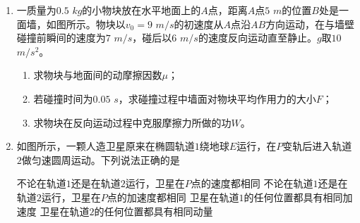 \begin{enumerate}[leftmargin=0em]
{}


\newpage
\item 
{}
一质量为$ 0.5 $ $ kg $的小物块放在水平地面上的$ A $点，距离$ A $点$ 5 $ $ m $的位置$ B $处是一面墙，如图所示。物块以$ v_{0} =9 $ $ m/s $的初速度从$ A $点沿$ AB $方向运动，在与墙壁碰撞前瞬间的速度为$ 7 $ $ m/s $，碰后以$ 6 $ $ m/s $的速度反向运动直至静止。$ g $取$ 10 $ $ m/s^{2} $。
\begin{enumerate}
\renewcommand{\labelenumi}{\arabic{enumi}.}
\item
求物块与地面间的动摩擦因数$ \mu $；
\item 
若碰撞时间为$ 0.05 $ $ s $，求碰撞过程中墙面对物块平均作用力的大小$ F $；
\item 
求物块在反向运动过程中克服摩擦力所做的功$ W $。



\end{enumerate}
\begin{figure}[h!]
\flushright

\end{figure}





\item 
{}
如图所示，一颗人造卫星原来在椭圆轨道$ 1 $绕地球$ E $运行，在$ P $变轨后进入轨道$ 2 $做匀速圆周运动。下列说法正确的是  
\begin{figure}[h!]
\centering

\end{figure}

\fourchoices
{不论在轨道$ 1 $还是在轨道$ 2 $运行，卫星在$ P $点的速度都相同}
{不论在轨道$ 1 $还是在轨道$ 2 $运行，卫星在$ P $点的加速度都相同}
{卫星在轨道$ 1 $的任何位置都具有相同加速度}
{卫星在轨道$ 2 $的任何位置都具有相同动量}



\end{enumerate}
